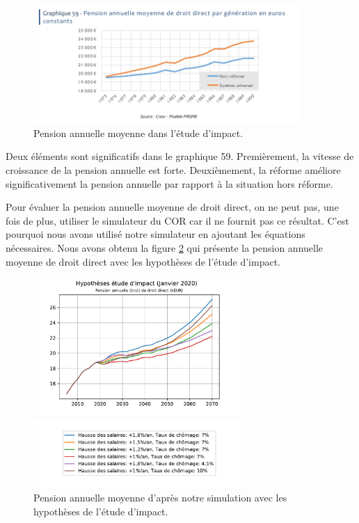 \documentclass[10pt]{article}
\begin{document}
\begin{figure}
\begin{center}
\includegraphics[width=0.9\textwidth]{../Figures-Etude-Impact/EtudeImpact-Graphique-59-PensionAnnuelle.png}
\end{center}

\caption{Pension annuelle moyenne dans l'étude d'impact.}
\label{fig-pension-annuelle-etude-impact}
\end{figure}

Deux éléments sont significatifs dans le graphique 59. 
Premièrement, la vitesse de croissance de la pension annuelle est forte. 
Deuxièmement, la réforme améliore significativement la pension annuelle 
par rapport à la situation hors réforme. 

Pour évaluer la pension annuelle moyenne de droit direct, on ne peut pas, 
une fois de plus, utiliser le simulateur du COR car
il ne fournit pas ce résultat.
C'est pourquoi nous avons utilisé notre simulateur en ajoutant les équations 
nécessaires. 
Nous avons obtenu la figure \ref{fig-pension-annuelle-simulation} qui présente 
la pension annuelle moyenne de droit direct avec les hypothèses de l'étude d'impact. 

\begin{figure}
\begin{center}
\includegraphics[width=0.7\textwidth]{Simulation-pension-annuelle-moyenne.pdf}

\includegraphics[width=0.7\textwidth]{Simulation-legende.pdf}
\end{center}

\caption{Pension annuelle moyenne d'après notre simulation 
avec les hypothèses de l'étude d'impact.}
\label{fig-pension-annuelle-simulation}
\end{figure}
\end{document}

